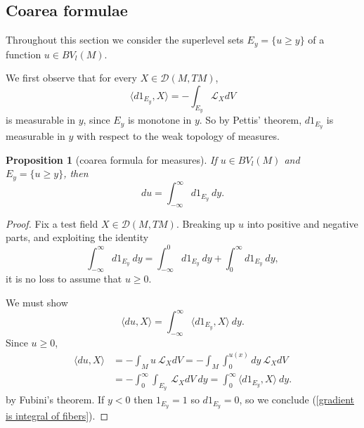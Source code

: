 \documentclass[reqno,12pt,letterpaper]{amsart}
\DeclareMathOperator{\Hom}{Hom}
\newtheorem{proposition}[theorem]{Proposition}
\theoremstyle{definition}
\numberwithin{equation}{section}
\begin{document}

\subsection{Coarea formulae}
Throughout this section we consider the superlevel sets $E_y = \{u \geq y\}$ of a function $u \in BV_l(M)$.

We first observe that for every $X \in \mathcal D(M, TM)$,
$$\langle d1_{E_y}, X\rangle = -\int_{E_y} \mathcal L_XdV$$
is measurable in $y$, since $E_y$ is monotone in $y$.
So by Pettis' theorem, $d1_{E_y}$ is measurable in $y$ with respect to the weak topology of measures.

\begin{proposition}[coarea formula for measures]\label{Coarea1}
If $u \in BV_l(M)$ and $E_y = \{u \geq y\}$, then
$$du = \int_{-\infty}^\infty d1_{E_y} ~dy.$$
\end{proposition}
\begin{proof}
Fix a test field $X \in \mathcal D(M, TM)$.
Breaking up $u$ into positive and negative parts, and exploiting the identity
$$\int_{-\infty}^\infty d1_{E_y} ~dy = \int_{-\infty}^0 d1_{E_y} ~dy + \int_0^\infty d1_{E_y} ~dy,$$
it is no loss to assume that $u \geq 0$.

We must show
\begin{equation}
\label{gradient is integral of fibers}
\langle du, X\rangle = \int_{-\infty}^\infty \langle d1_{E_y}, X\rangle ~dy.
\end{equation}
Since $u \geq 0$,
\begin{align*}
\langle du, X\rangle &= -\int_M u~\mathcal L_XdV = -\int_M \int_0^{u(x)} dy ~\mathcal L_XdV\\
&= -\int_0^\infty \int_{E_y} ~\mathcal L_XdV ~dy = \int_0^\infty \langle d1_{E_y}, X\rangle ~dy.
\end{align*}
by Fubini's theorem.
If $y < 0$ then $1_{E_y} = 1$ so $d1_{E_y} = 0$, so we conclude (\ref{gradient is integral of fibers}).
\end{proof}
\end{document}
